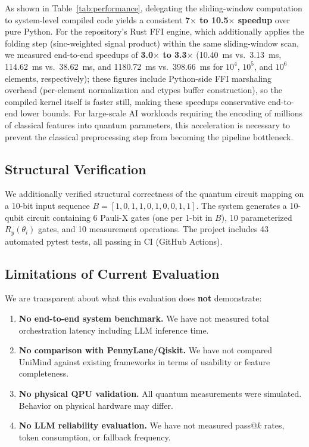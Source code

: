 ﻿\documentclass[12pt,a4paper]{article}
\begin{document}
As shown in Table~\ref{tab:performance}, delegating the sliding-window computation to system-level compiled code yields a consistent \textbf{7$\times$ to 10.5$\times$ speedup} over pure Python. For the repository's Rust FFI engine, which additionally applies the folding step (sinc-weighted signal product) within the same sliding-window scan, we measured end-to-end speedups of \textbf{3.0$\times$ to 3.3$\times$} (10.40~ms vs.\ 3.13~ms, 114.62~ms vs.\ 38.62~ms, and 1180.72~ms vs.\ 398.66~ms for $10^4$, $10^5$, and $10^6$ elements, respectively); these figures include Python-side FFI marshaling overhead (per-element normalization and ctypes buffer construction), so the compiled kernel itself is faster still, making these speedups conservative end-to-end lower bounds. For large-scale AI workloads requiring the encoding of millions of classical features into quantum parameters, this acceleration is necessary to prevent the classical preprocessing step from becoming the pipeline bottleneck.

\subsection{Structural Verification}

We additionally verified structural correctness of the quantum circuit mapping on a 10-bit input sequence $B = [1, 0, 1, 1, 0, 1, 0, 0, 1, 1]$. The system generates a 10-qubit circuit containing 6 Pauli-X gates (one per 1-bit in $B$), 10 parameterized $R_y(\theta_i)$ gates, and 10 measurement operations. The project includes 43 automated pytest tests, all passing in CI (GitHub Actions).

\subsection{Limitations of Current Evaluation}

We are transparent about what this evaluation does \textbf{not} demonstrate:

\begin{enumerate}[leftmargin=2em]
    \item \textbf{No end-to-end system benchmark.} We have not measured total orchestration latency including LLM inference time.
    \item \textbf{No comparison with PennyLane/Qiskit.} We have not compared UniMind against existing frameworks in terms of usability or feature completeness.
    \item \textbf{No physical QPU validation.} All quantum measurements were simulated. Behavior on physical hardware may differ.
    \item \textbf{No LLM reliability evaluation.} We have not measured pass@$k$ rates, token consumption, or fallback frequency.
\end{enumerate}
\end{document}

